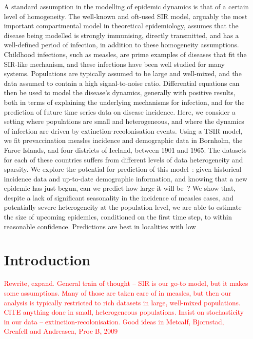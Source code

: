 \documentclass[10pt]{article}
\begin{document}
A standard assumption in the modelling of epidemic dynamics is that of a certain level of homogeneity. The well-known and oft-used SIR model, arguably the most important compartmental model in theoretical epidemiology, assumes that the disease being modelled is strongly immunising, directly transmitted, and has a well-defined period of infection, in addition to these homogeneity assumptions. Childhood infections, such as measles, are prime examples of diseases that fit the SIR-like mechanism, and these infections have been well studied for many systems. Populations are typically assumed to be large and well-mixed, and the data assumed to contain a high signal-to-noise ratio. Differential equations can then be used to model the disease's dynamics, generally with positive results, both in terms of explaining the underlying mechanisms for infection, and for the prediction of future time series data on disease incidence. Here, we consider a setting where populations are small and heterogeneous, and where the dynamics of infection are driven by extinction-recolonisation events. Using a TSIR model, we fit prevaccination measles incidence and demographic data in Bornholm, the Faroe Islands, and four districts of Iceland, between 1901 and 1965. The datasets for each of these countries suffers from different levels of data heterogeneity and sparsity. We explore the potential for prediction of this model~: given historical incidence data and up-to-date demographic information, and knowing that a new epidemic has just begun, can we predict how large it will be~? We show that, despite a lack of significant seasonality in the incidence of measles cases, and potentially severe heterogeneity at the population level, we are able to estimate the size of upcoming epidemics, conditioned on the first time step, to within reasonable confidence. Predictions are best in localities with low 















\section*{Introduction}

\textcolor{red}{Rewrite, expand. General train of thought -- SIR is our go-to model, but it makes some assumptions. Many of those are taken care of in measles, but then our analysis is typically restricted to rich datasets in large, well-mixed populations. CITE anything done in small, heterogeneous populations. Insist on stochasticity in our data -- extinction-recolonisation. Good ideas in Metcalf, Bjornstad, Grenfell and Andreasen, Proc B, 2009}
\end{document}

